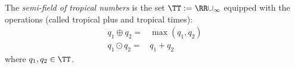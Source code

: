 

The \emph{semi-field of tropical numbers} is the set $\TT:= \RR\cup_\infty$ equipped with the operations (called tropical plus and tropical times):
\begin{align*}
    q_1\oplus q_2 =& \max(q_1, q_2)\\
    q_1\odot  q_2 =& q_1+q_2
\end{align*}
where $q_1, q_2\in \TT$.